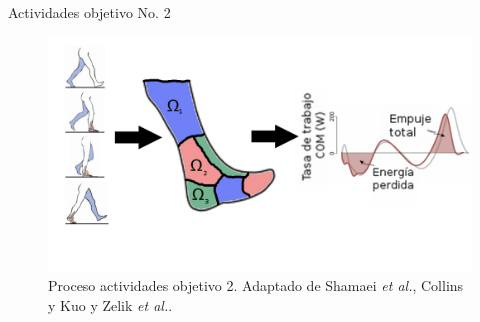 \documentclass[10pt]{beamer}
\begin{document}
\begin{frame}{Actividades objetivo No. 2}


\begin{center}
\begin{figure}
\includegraphics[scale=0.23]{Feathergraphics/Actividades2}
\caption{Proceso actividades objetivo 2. Adaptado de Shamaei \emph{et al.}\cite{Shamaei2013}, Collins y Kuo \cite{Collins2010} y Zelik \emph{et al.}\cite{Zelik2010}.}
\end{figure}
\end{center}
\end{frame}
\end{document}
